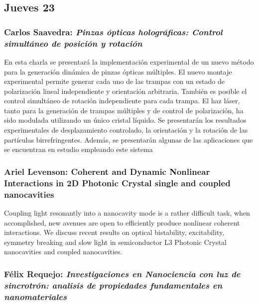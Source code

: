 \subsection*{Jueves 23}

\subsubsection*{Carlos Saavedra: \textit{Pinzas \'opticas hologr\'aficas:
Control simult\'aneo de posici\'on y rotaci\'on}}

En esta charla se presentar\'a la implementaci\'on experimental de un nuevo
m\'etodo para la generaci\'on din\'amica de pinzas \'opticas m\'ultiples. El
nuevo montaje experimental permite generar cada uno de las trampas con un estado
de polarizaci\'on lineal independiente y orientaci\'on arbitraria. Tambi\'en es
posible el control simult\'aneo de rotaci\'on independiente para cada trampa. El
haz l\'aser, tanto para la generaci\'on de trampas  m\'ultiples y de control de
polarizaci\'on, ha sido modulada utilizando un \'unico cristal l\'iquido. Se
presentar\'an los resultados experimentales de desplazamiento controlado, la
orientaci\'on y la rotaci\'on de las part\'iculas birrefringentes. Adem\'as, se
presentar\'an algunas de las aplicaciones que se encuentran en estudio empleando
este sistema

\subsubsection*{Ariel Levenson: Coherent and Dynamic Nonlinear Interactions in
2D Photonic Crystal single and coupled nanocavities}

Coupling light resonantly into a nanocavity mode is a
rather difficult task, when accomplished, new avenues are open to
efficiently produce nonlinear coherent interactions. We discuss recent
results on optical bistability, excitability, symmetry breaking and
slow light in semiconductor L3 Photonic Crystal nanocavities and
coupled nanocavities.

\subsubsection*{F\'elix Requejo: \textit{Investigaciones en Nanociencia con luz
de sincrotr\'on: analisis de propiedades fundamentales en nanomateriales}}

